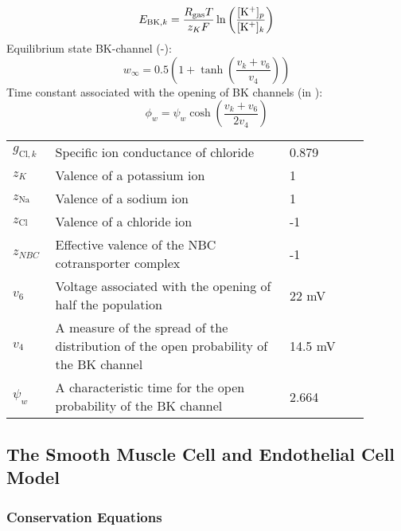 \begin{equation} \label{eq:E_BK}
E_{\text{BK},k} = \frac{R_{\text{gas}} T}{z_K F}\ln\left( \frac{[\text{K$^+$}]_p}{[\text{K$^+$}]_k}\right) 
\end{equation}
%
Equilibrium state BK-channel (-):
\begin{equation} \label{eq:winf}
w_{\infty} = 0.5 \left(1+\tanh\left(\frac{v_{k}+v_{6} }{v_{4}} \right)  \right) 
\end{equation}
%
Time constant associated with the opening of BK channels	 (in \pers):
\begin{equation} \label{eq:phin}
\phi_{w} = \psi_{w}\cosh\left( \frac{v_{k}+v_{6}}{2v_{4}}\right) 
\end{equation}

\begin{table}[h!]
\centering
\begin{tabular}{ p{0.09\linewidth}  >{\footnotesize} p{0.6\linewidth}  >{\footnotesize} p{0.17\linewidth} >{\footnotesize} p{0.03\linewidth} }
\hline
$g_{\text{Cl},k}$ 		& Specific ion conductance of chloride 									& 0.879 \perOhmm & \cite{Ostby2009}  \\
$z_K$			& Valence of a potassium ion										& 1   & \\ 
$z_{\text{Na}}$			& Valence of a sodium ion											& 1   & \\ 
$z_{\text{Cl}}$			& Valence of a chloride ion											& -1  & \\ 
$z_{NBC}$ 		& Effective valence of the NBC cotransporter complex 				& -1 & \\
$v_{6}$			& Voltage associated with the opening of half the population		& 22 mV  & \cite{GonzalezFernandez1994}  \\
$v_{4}$			& A measure of the spread of the distribution of the open probability of the BK channel	& 14.5 mV   &  \cite{GonzalezFernandez1994}  
\\
$ \psi_{w}$    	& A characteristic time for the open probability of the BK channel		& 2.664 \pers & \cite{GonzalezFernandez1994} \\
\hline
\end{tabular}
\end{table}

\subsection{The Smooth Muscle Cell and Endothelial Cell Model}\label{sec:EqSMCEC}

\subsubsection*{Conservation Equations}

